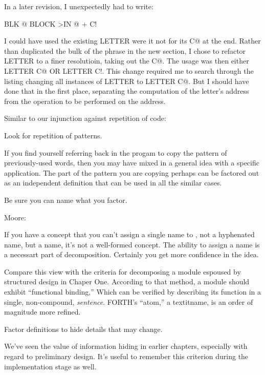In a later revision, I unexpectedly had to write:

\begin{Code}
BLK @ BLOCK  >IN @ +  C!
\end{Code}
I could have used the existing LETTER were it not for its C@ at the end. Rather than duplicated the bulk of the phrase in the new section, I chose to refactor LETTER to a finer resolutioin, taking out the C@. The usage was then either LETTER C@ OR LETTER C!. This change required me to search through the listing changing all instances of LETTER to LETTER C@. But I should have done that in the first place, separating the computation of the letter's address from the operation to be performed on the address.

Similar to our injunction against repetition of code:

\begin{tip}
Look for repetition of patterns.
\end{tip}
If you find yourself referring back in the progam to copy the pattern of previously-used words, then you may have mixed in a general idea with a specific application. The part of the pattern you are copying perhaps can be factored out as an independent definition that can be used in all the similar cases.

\begin{tip}
Be sure you can name what you factor.
\end{tip}

\bigskip
\blackline{2ex}
\noindent Moore:

\begin{tfquot}
If you have a concept that you can't assign a single name to , not a hyphenated name, but a name, it's not a well-formed concept. The ability to assign a name is a necessart part of decomposition. Certainly you get more confidence in the idea.
\end{tfquot}
\blackline{1ex}
Compare this view with the criteria for decomposing a module espoused by structured design in Chaper One. According to that method, a module should exhibit ``functional binding,'' Which can be verified by describing its function in a single, non-compound, \emph{sentence}. FORTH's ``atom,'' a textit{name}, is an order of magnitude more refined.

\begin{tip}
Factor definitions to hide details that may change.
\end{tip}
We've seen the value of information hiding in earlier chapters, especially with regard to preliminary design. It's useful to remember this criterion during the implementation stage as well.

